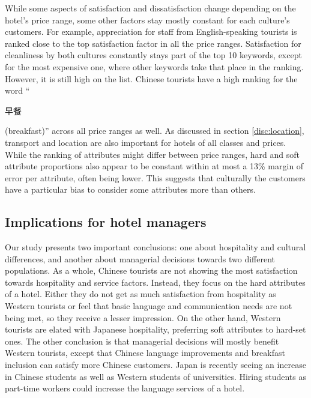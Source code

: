 \documentclass[smallextended,natbib]{svjour3}       %
\begin{document}
    While some aspects of satisfaction and dissatisfaction change depending on the hotel's price range, some other factors stay mostly constant for each culture's customers. For example, appreciation for staff from English-speaking tourists is ranked close to the top satisfaction factor in all the price ranges. Satisfaction for cleanliness by both cultures constantly stays part of the top 10 keywords, except for the most expensive one, where other keywords take that place in the ranking. However, it is still high on the list. Chinese tourists have a high ranking for the word ``\begin{CJK}{UTF8}{gbsn}早餐\end{CJK} (breakfast)'' across all price ranges as well. As discussed in section \ref{disc:location}, transport and location are also important for hotels of all classes and prices. While the ranking of attributes might differ between price ranges, hard and soft attribute proportions also appear to be constant within at most a 13\% margin of error per attribute, often being lower. This suggests that culturally the customers have a particular bias to consider some attributes more than others.

  \subsection{Implications for hotel managers}\label{disc:implications}

    Our study presents two important conclusions: one about hospitality and cultural differences, and another about managerial decisions towards two different populations. As a whole, Chinese tourists are not showing the most satisfaction towards hospitality and service factors. Instead, they focus on the hard attributes of a hotel. Either they do not get as much satisfaction from hospitality as Western tourists or feel that basic language and communication needs are not being met, so they receive a lesser impression. On the other hand, Western tourists are elated with Japanese hospitality, preferring soft attributes to hard-set ones. The other conclusion is that managerial decisions will mostly benefit Western tourists, except that Chinese language improvements and breakfast inclusion can satisfy more Chinese customers. Japan is recently seeing an increase in Chinese students as well as Western students of universities. Hiring students as part-time workers could increase the language services of a hotel.
\end{document}
